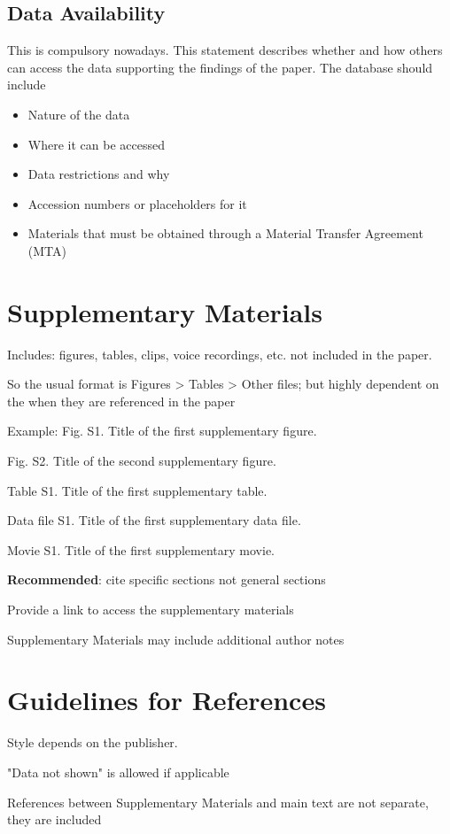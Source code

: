 \documentclass{article}
\begin{document}
	
	\subsection*{Data Availability}
	This is compulsory nowadays. This statement describes whether and how others can access the data supporting the findings of the paper. The database should include
	
	\begin{itemize}
		\item Nature of the data 
		\item Where it can be accessed
		\item Data restrictions and why
		\item Accession numbers or placeholders for it
		\item Materials that must be obtained through a Material Transfer Agreement (MTA)
	\end{itemize}
	
	
	
	\section*{Supplementary Materials}
	Includes: figures, tables, clips, voice recordings, etc. not included in the paper. 
	
	So the usual format is Figures > Tables > Other files; but highly dependent on the when they are referenced in the paper
	
	\medskip Example:
	Fig. S1. Title of the first supplementary figure.
	
	Fig. S2. Title of the second supplementary figure.
	
	Table S1. Title of the first supplementary table.
	
	Data file S1. Title of the first supplementary data file.
	
	Movie S1. Title of the first supplementary movie.
	
	\medskip
	\textbf{Recommended}: cite specific sections not general sections
	
	Provide a link to access the supplementary materials
	
	Supplementary Materials may include additional author notes
	
	\section*{Guidelines for References}
	Style depends on the publisher.
	
	"Data not shown" is allowed if applicable
	
	References between Supplementary Materials and main text are not separate, they are included 
	
	\printbibliography
	
\end{document}
